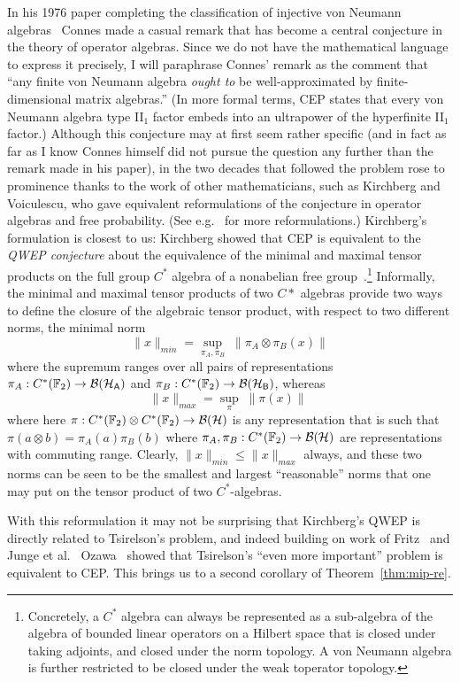 In his 1976 paper completing 
 the classification of injective von Neumann algebras~\cite{connes1976classification} Connes made a casual remark that has become a central conjecture in the theory of operator algebras. Since we do not have the mathematical language to express it precisely, I will paraphrase Connes' remark as the comment that ``any finite von Neumann algebra \emph{ought to} be well-approximated by finite-dimensional matrix algebras.'' (In more formal terms, CEP states that every von Neumann algebra type II$_1$ factor embeds into an ultrapower of the hyperfinite II$_1$ factor.) Although this conjecture may at first seem rather specific (and in fact as far as I know Connes himself did not pursue the question any further than the remark made in his paper), in the two decades that followed the problem rose to prominence thanks to the work of other mathematicians, such as Kirchberg and Voiculescu, who gave equivalent reformulations of the conjecture in operator algebras and free probability. (See e.g.~\cite{Capraro2015} for more reformulations.)
Kirchberg's formulation is closest to us: Kirchberg showed that CEP is equivalent to the \emph{QWEP conjecture} about the equivalence of the minimal and maximal tensor products on the full group $C^*$ algebra of a nonabelian free group~\cite{kirchberg1993non}.\footnote{Concretely, a $C^*$ algebra can always be represented as a sub-algebra of the algebra of bounded linear operators on a Hilbert space that is closed under taking adjoints, and closed under the norm topology. A von Neumann algebra is further restricted to be closed under the weak toperator topology.} 
Informally, the minimal and maximal tensor products of two $C*$ algebras provide two ways to define the closure of the algebraic tensor product, with respect to two different norms, the minimal norm 
\[ \|x\|_{min} = \sup_{\pi_A,\pi_B} \;\big\|\pi_A\otimes \pi_B( x)\big\|\]
where the supremum ranges over all pairs of representations $\pi_A : C^*(\mathbb{F}_2) \to \mathcal{B}(\mathcal{H}_{\textsf{A}})$ and $\pi_B : C^*(\mathbb{F}_2) \to \mathcal{B}(\mathcal{H}_{\textsf{B}})$, whereas
\[ \|x\|_{max} = \sup_{\pi} \;\|\pi( x)\|\;\]
where here $\pi: C^*(\mathbb{F}_2) \otimes  C^*(\mathbb{F}_2)\to \mathcal{B}(\mathcal{H})$ is any representation that is such that $\pi(a\otimes b)=\pi_A(a)\pi_B(b)$ where  $\pi_A,\pi_B : C^*(\mathbb{F}_2) \to \mathcal{B}(\mathcal{H})$ are representations with commuting range. Clearly, $\|x\|_{min} \leq \|x\|_{max}$ always, and these two norms can be seen to be the smallest and largest ``reasonable'' norms that one may put on the tensor product of two $C^*$-algebras.

With this reformulation it may not be surprising that Kirchberg's QWEP is directly related to Tsirelson's problem, and indeed building on work of Fritz~\cite{fritz2012tsirelson} and Junge et al.~\cite{junge2011connes} Ozawa~\cite{ozawa2012connes} showed that Tsirelson's ``even more important'' problem is equivalent to CEP. This brings us to a second corollary of Theorem~\ref{thm:mip-re}.

